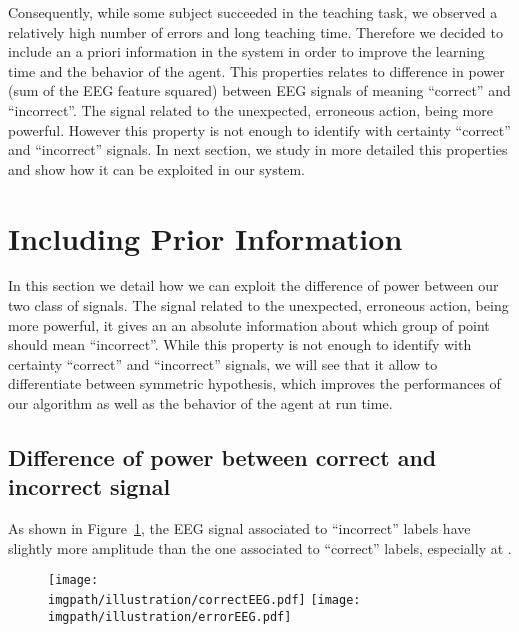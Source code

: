 Consequently, while some subject succeeded in the teaching task, we observed a relatively high number of errors and long teaching time. Therefore we decided to include an a priori information in the system in order to improve the learning time and the behavior of the agent. This properties relates to difference in power (sum of the EEG feature squared) between EEG signals of meaning ``correct'' and ``incorrect''. The signal related to the unexpected, erroneous action, being more powerful. However this property is not enough to identify with certainty ``correct'' and ``incorrect'' signals. In next section, we study in more detailed this properties and show how it can be exploited in our system.

\section{Including Prior Information}

In this section we detail how we can exploit the difference of power between our two class of signals. The signal related to the unexpected, erroneous action, being more powerful, it gives an an absolute information about which group of point should mean ``incorrect''. While this property is not enough to identify with certainty ``correct'' and ``incorrect'' signals, we will see that it allow to differentiate between symmetric hypothesis, which improves the performances of our algorithm as well as the behavior of the agent at run time. 

\subsection{Difference of power between correct and incorrect signal}

As shown in Figure~\ref{fig:EEGsample}, the EEG signal associated to ``incorrect'' labels have slightly more amplitude than the one associated to ``correct'' labels, especially at .

\begin{figure}[!ht]
\centering
\texttt{[image: \\imgpath/illustration/correctEEG.pdf]}
\texttt{[image: \\imgpath/illustration/errorEEG.pdf]}
\caption{}
\label{fig:EEGsample}
\end{figure}

